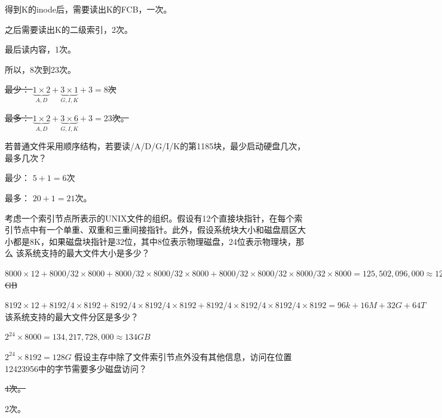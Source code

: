 \documentclass{ctexart}
\begin{document}
\begin{outline}[enumerate]
            得到K的inode后，需要读出K的FCB，一次。

            之后需要读出K的二级索引，2次。

            最后读内容，1次。

            所以，8次到23次。
        
            \sout{最少： $\underbrace{1 \times 2}_{A, D} + \underbrace{3 \times 1}_{G,I,K} + 3 = 8$次}

            \sout{最多： $\underbrace{1 \times 2}_{A, D} + \underbrace{3 \times 6}_{G,I,K} + 3 = 23$次。
            }

        \2 若普通文件采用顺序结构，若要读/A/D/G/I/K的第1185块，最少启动硬盘几次，最多几次？

            最少： $5 + 1 = 6$次

            最多： $20 + 1 = 21$次。
    
    \1 考虑一个索引节点所表示的UNIX文件的组织。假设有12个直接块指针，在每个索引节点中有一个单重、双重和三重间接指针。此外，假设系统块大小和磁盘扇区大小都是8K，如果磁盘块指针是32位，其中8位表示物理磁盘，24位表示物理块，那么
    \2 该系统支持的最大文件大小是多少？

        \sout{$8000 \times 12 + 8000 / 32 \times 8000 + 8000 / 32 \times 8000 / 32 \times 8000 + 8000 / 32 \times 8000 / 32 \times 8000 / 32 \times 8000 = 125,502,096,000 \approx 125.5$GB}

        $8192 \times 12 + 8192 / 4 \times 8192 + 8192 / 4 \times 8192 / 4 \times 8192 + 8192 / 4 \times 8192 / 4 \times 8192 / 4 \times 8192 = 96k + 16M + 32G + 64T$
    \2 该系统支持的最大文件分区是多少？

        \sout{$2^{24} \times 8000 = 134,217,728,000 \approx 134GB$}

        $2^{24} \times 8192 = 128G$
    \2 假设主存中除了文件索引节点外没有其他信息，访问在位置12423956中的字节需要多少磁盘访问？

        \sout{4次。}
        
        2次。

\end{outline}
\end{document}
